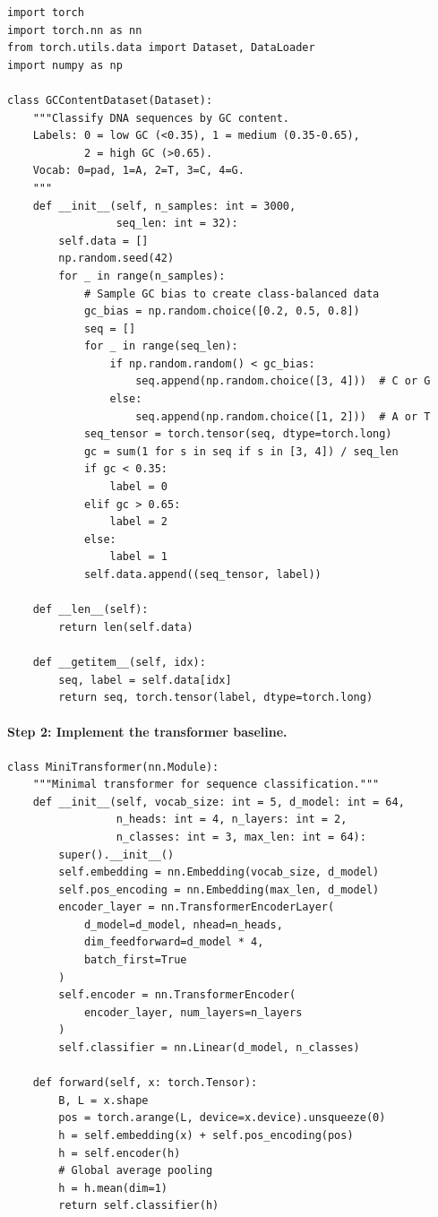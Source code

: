 \begin{lstlisting}[style=dogmapython, caption={Lab 7: GC content classification dataset.}]
import torch
import torch.nn as nn
from torch.utils.data import Dataset, DataLoader
import numpy as np

class GCContentDataset(Dataset):
    """Classify DNA sequences by GC content.
    Labels: 0 = low GC (<0.35), 1 = medium (0.35-0.65),
            2 = high GC (>0.65).
    Vocab: 0=pad, 1=A, 2=T, 3=C, 4=G.
    """
    def __init__(self, n_samples: int = 3000,
                 seq_len: int = 32):
        self.data = []
        np.random.seed(42)
        for _ in range(n_samples):
            # Sample GC bias to create class-balanced data
            gc_bias = np.random.choice([0.2, 0.5, 0.8])
            seq = []
            for _ in range(seq_len):
                if np.random.random() < gc_bias:
                    seq.append(np.random.choice([3, 4]))  # C or G
                else:
                    seq.append(np.random.choice([1, 2]))  # A or T
            seq_tensor = torch.tensor(seq, dtype=torch.long)
            gc = sum(1 for s in seq if s in [3, 4]) / seq_len
            if gc < 0.35:
                label = 0
            elif gc > 0.65:
                label = 2
            else:
                label = 1
            self.data.append((seq_tensor, label))

    def __len__(self):
        return len(self.data)

    def __getitem__(self, idx):
        seq, label = self.data[idx]
        return seq, torch.tensor(label, dtype=torch.long)
\end{lstlisting}

\paragraph{Step 2: Implement the transformer baseline.}

\begin{lstlisting}[style=dogmapython, caption={Lab 7: Minimal transformer classifier.}]
class MiniTransformer(nn.Module):
    """Minimal transformer for sequence classification."""
    def __init__(self, vocab_size: int = 5, d_model: int = 64,
                 n_heads: int = 4, n_layers: int = 2,
                 n_classes: int = 3, max_len: int = 64):
        super().__init__()
        self.embedding = nn.Embedding(vocab_size, d_model)
        self.pos_encoding = nn.Embedding(max_len, d_model)
        encoder_layer = nn.TransformerEncoderLayer(
            d_model=d_model, nhead=n_heads,
            dim_feedforward=d_model * 4,
            batch_first=True
        )
        self.encoder = nn.TransformerEncoder(
            encoder_layer, num_layers=n_layers
        )
        self.classifier = nn.Linear(d_model, n_classes)

    def forward(self, x: torch.Tensor):
        B, L = x.shape
        pos = torch.arange(L, device=x.device).unsqueeze(0)
        h = self.embedding(x) + self.pos_encoding(pos)
        h = self.encoder(h)
        # Global average pooling
        h = h.mean(dim=1)
        return self.classifier(h)
\end{lstlisting}

